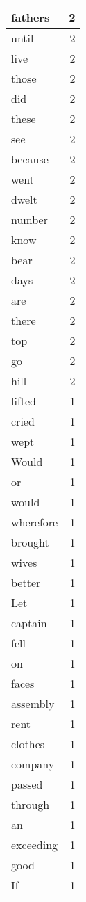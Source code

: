\begin{center}
\begin{longtable}{l|r}
fathers & 2 \\ \hline
until & 2 \\ \hline
live & 2 \\ \hline
those & 2 \\ \hline
did & 2 \\ \hline
these & 2 \\ \hline
see & 2 \\ \hline
because & 2 \\ \hline
went & 2 \\ \hline
dwelt & 2 \\ \hline
number & 2 \\ \hline
know & 2 \\ \hline
bear & 2 \\ \hline
days & 2 \\ \hline
are & 2 \\ \hline
there & 2 \\ \hline
top & 2 \\ \hline
go & 2 \\ \hline
hill & 2 \\ \hline
lifted & 1 \\ \hline
cried & 1 \\ \hline
wept & 1 \\ \hline
Would & 1 \\ \hline
or & 1 \\ \hline
would & 1 \\ \hline
wherefore & 1 \\ \hline
brought & 1 \\ \hline
wives & 1 \\ \hline
better & 1 \\ \hline
Let & 1 \\ \hline
captain & 1 \\ \hline
fell & 1 \\ \hline
on & 1 \\ \hline
faces & 1 \\ \hline
assembly & 1 \\ \hline
rent & 1 \\ \hline
clothes & 1 \\ \hline
company & 1 \\ \hline
passed & 1 \\ \hline
through & 1 \\ \hline
an & 1 \\ \hline
exceeding & 1 \\ \hline
good & 1 \\ \hline
If & 1 \\ \hline

\end{longtable}
\end{center}
